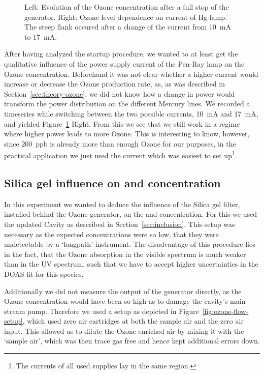 \begin{figure}[htbp]
  \centering
  
  \hfill
  
  \caption{Left: Evolution of the Ozone concentration after a full stop of the
    generator. Right: Ozone level dependence on current of Hg-lamp. The steep
    flank occured after a change of the current from
    \SI{10}{\milli\ampere} to \SI{17}{\milli\ampere}.}
  \label{fig:multiple-stop}
\end{figure}

After having analyzed the startup procedure, we wanted to at least get
the qualitative influence of the power supply current of the Pen-Ray
lamp on the Ozone concentration. Beforehand it was not clear whether a
higher current would increase or decrease the Ozone production rate,
as, as was described in Section~\ref{sec:theory-ozone}, we did not
know how a change in power would transform the power distribution on
the different Mercury lines. We recorded a timeseries while switching
between the two possible currents, \SI{10}{\milli\ampere} and
\SI{17}{\milli\ampere}, and yielded 
Figure~\ref{fig:multiple-stop} Right. From this we see that we still work in a regime
where higher power leads to more Ozone. This is interesting to know,
however, since \SI{200}{ppb} is already more than enough Ozone for our
purposes, in the practical application we just used the current
which was easiest to set up\footnote{The currents of all used supplies
  lay in the same region.}.

\subsection{Silica gel influence on  and  concentration}
\label{sec:silica}

In this experiment we wanted to deduce the influence of the Silica gel
filter, installed behind the Ozone generator, on the  and
 concentration. For this we used the updated Cavity as
described in Section~\ref{sec:inclusion}. This setup was necessary as
the expected  concentrations were so low, that they were
undetectable by a `longpath' instrument. The disadvantage of this
procedure lies in the fact, that the Ozone absorption in the visible
spectrum is much weaker than in the UV spectrum, such that we have to
accept higher uncertainties in the DOAS fit for this species. 

Additionally we did not measure the output of the generator directly,
as the Ozone concentration would have been so high as to damage the cavity's
main stream pump. Therefore we used a setup as depicted
in Figure~\ref{fig:ozone-flow-setup}, which used zero air cartridges at
both the sample air and the zero air input. This allowed us to dilute
the Ozone enriched air by mixing it with the `sample air', which was
then trace gas free and hence kept additional errors down.


